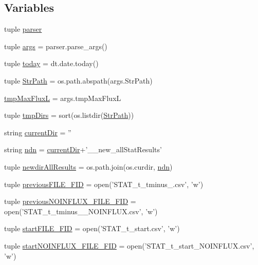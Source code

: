 \subsection*{Variables}
\begin{DoxyCompactItemize}
\item 
tuple \hyperlink{a00130_ac24ead92a86e25ec9213d8c7253d4b60}{parser}
\item 
tuple \hyperlink{a00130_a4912a255d0be60fffea119e6bd92b6e4}{args} = parser.\-parse\-\_\-args()
\item 
tuple \hyperlink{a00130_ac99ee9d8196d8a2305b9f4c795b23b97}{today} = dt.\-date.\-today()
\item 
tuple \hyperlink{a00130_ac34f3f43f888eb6620266d78ce928ceb}{Str\-Path} = os.\-path.\-abspath(args.\-Str\-Path)
\item 
\hyperlink{a00130_a22a52c6b87e96dc826bc621ee88c380a}{tmp\-Max\-Flux\-L} = args.\-tmp\-Max\-Flux\-L
\item 
tuple \hyperlink{a00130_ab71c19ee20acae0f07934a8d0e9fe50b}{tmp\-Dirs} = sort(os.\-listdir(\hyperlink{a00130_ac34f3f43f888eb6620266d78ce928ceb}{Str\-Path}))
\item 
string \hyperlink{a00130_ae98225d5c8c20399f5c3b888fa37746f}{current\-Dir} = ''
\item 
string \hyperlink{a00130_a5e117df6e0cdffdae13947622c6c4890}{ndn} = \hyperlink{a00130_ae98225d5c8c20399f5c3b888fa37746f}{current\-Dir}+'\-\_\-\_\-new\-\_\-all\-Stat\-Results'
\item 
tuple \hyperlink{a00130_a62d6cfd52b4428ab7ea4d75d43b2d49b}{newdir\-All\-Results} = os.\-path.\-join(os.\-curdir, \hyperlink{a00130_a5e117df6e0cdffdae13947622c6c4890}{ndn})
\item 
tuple \hyperlink{a00130_aba65725a1bd6d1b891b02dc7f3db2335}{previous\-F\-I\-L\-E\-\_\-\-F\-I\-D} = open('S\-T\-A\-T\-\_\-t\-\_\-tminus\-\_.\-csv', 'w')
\item 
tuple \hyperlink{a00130_a9f9485bf6f7a3734bbd110b756005b71}{previous\-N\-O\-I\-N\-F\-L\-U\-X\-\_\-\-F\-I\-L\-E\-\_\-\-F\-I\-D} = open('S\-T\-A\-T\-\_\-t\-\_\-tminus\-\_\-\_\-\-N\-O\-I\-N\-F\-L\-U\-X.\-csv', 'w')
\item 
tuple \hyperlink{a00130_a0239a9dcc4900463a0c19557bec23521}{start\-F\-I\-L\-E\-\_\-\-F\-I\-D} = open('S\-T\-A\-T\-\_\-t\-\_\-start.\-csv', 'w')
\item 
tuple \hyperlink{a00130_a44f4f158af9771fbabbbacc4f4484d32}{start\-N\-O\-I\-N\-F\-L\-U\-X\-\_\-\-F\-I\-L\-E\-\_\-\-F\-I\-D} = open('S\-T\-A\-T\-\_\-t\-\_\-start\-\_\-\-N\-O\-I\-N\-F\-L\-U\-X.\-csv', 'w')

\end{DoxyCompactItemize}
